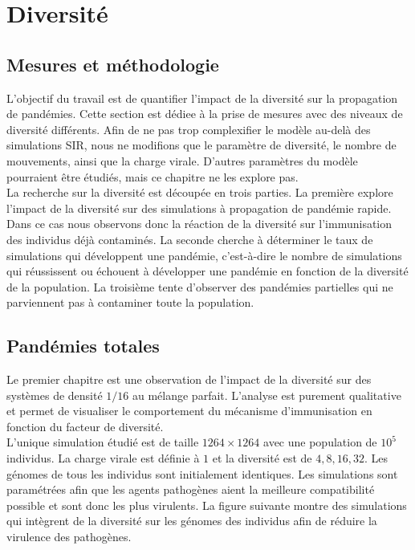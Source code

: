 \chapter{Diversité} \label{ch:DIV}

\section{Mesures et méthodologie}

L'objectif du travail est de quantifier l'impact de la diversité sur la propagation de pandémies. Cette section est dédiee à la prise de mesures avec des niveaux de diversité différents. Afin de ne pas trop complexifier le modèle au-delà des simulations SIR, nous ne modifions que le paramètre de diversité, le nombre de mouvements, ainsi que la charge virale. D'autres paramètres du modèle pourraient être étudiés, mais ce chapitre ne les explore pas.\\

La recherche sur la diversité est découpée en trois parties. La première explore l'impact de la diversité sur des simulations à propagation de pandémie rapide. Dans ce cas nous observons donc la réaction de la diversité sur l'immunisation des individus déjà contaminés. La seconde cherche à déterminer le taux de simulations qui développent une pandémie, c'est-à-dire le nombre de simulations qui réussissent ou échouent à développer une pandémie en fonction de la diversité de la population. La troisième tente d'observer des pandémies partielles qui ne parviennent pas à contaminer toute la population.\\


\section{Pandémies totales}

Le premier chapitre est une observation de l'impact de la diversité sur des systèmes de densité $1/16$ au mélange parfait. L'analyse est purement qualitative et permet de visualiser le comportement du mécanisme d'immunisation en fonction du facteur de diversité.\\

L'unique simulation étudié est de taille $1264 \times 1264$ avec une population de $10^5$ individus. La charge virale est définie à $1$ et la diversité est de $4,8,16,32$. Les génomes de tous les individus sont initialement identiques. Les simulations sont paramétrées afin que les agents pathogènes aient la meilleure compatibilité possible et sont donc les plus virulents. La figure suivante montre des simulations qui intègrent de la diversité sur les génomes des individus afin de réduire la virulence des pathogènes.

